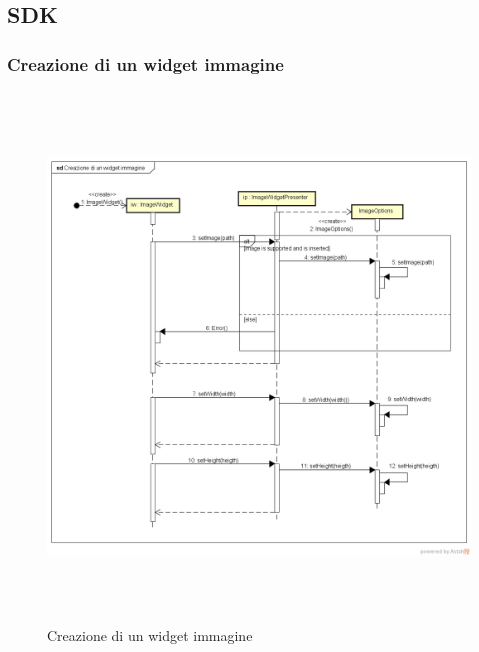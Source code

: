 \subsection{SDK}

\subsubsection{Creazione di un widget immagine}

\label{Creazione di un widget immagine}
\begin{figure}[ht]
	\centering
	\includegraphics[width=16cm, height=14cm]{Sezioni/Diagrammi/img/CreazioneWidgetImmagine.png}
	\caption{Creazione di un widget immagine}
\end{figure}

